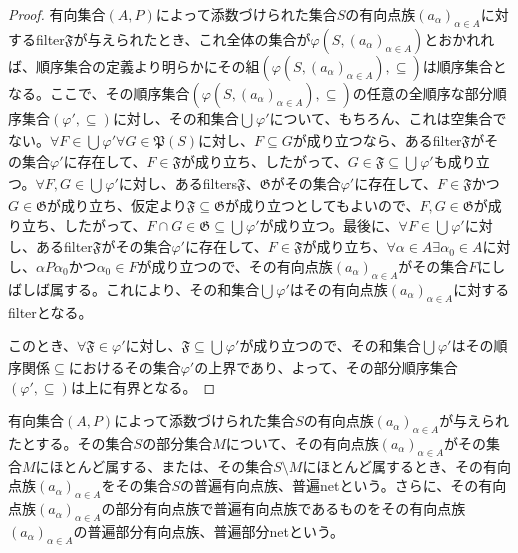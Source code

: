 \documentclass[dvipdfmx]{jsarticle}
\begin{document}
\begin{proof}
有向集合$(A,P)$によって添数づけられた集合$S$の有向点族$\left( a_{\alpha} \right)_{\alpha \in A}$に対するfilter$\mathfrak{F}$が与えられたとき、これ全体の集合が$\varphi\left( S,\left( a_{\alpha} \right)_{\alpha \in A} \right)$とおかれれば、順序集合の定義より明らかにその組$\left( \varphi\left( S,\left( a_{\alpha} \right)_{\alpha \in A} \right), \subseteq \right)$は順序集合となる。ここで、その順序集合$\left( \varphi\left( S,\left( a_{\alpha} \right)_{\alpha \in A} \right), \subseteq \right)$の任意の全順序な部分順序集合$\left( \varphi', \subseteq \right)$に対し、その和集合$\bigcup_{} \varphi'$について、もちろん、これは空集合でない。$\forall F \in \bigcup_{} \varphi'\forall G \in \mathfrak{P}(S)$に対し、$F \subseteq G$が成り立つなら、あるfilter$\mathfrak{F}$がその集合$\varphi'$に存在して、$F\in \mathfrak{F}$が成り立ち、したがって、$G \in \mathfrak{F \subseteq}\bigcup_{} \varphi'$も成り立つ。$\forall F,G \in \bigcup_{} \varphi'$に対し、あるfilters$\mathfrak{F}$、$\mathfrak{G}$がその集合$\varphi'$に存在して、$F\in \mathfrak{F}$かつ$G \in \mathfrak{G}$が成り立ち、仮定より$\mathfrak{F \subseteq G}$が成り立つとしてもよいので、$F,G \in \mathfrak{G}$が成り立ち、したがって、$F \cap G \in \mathfrak{G \subseteq}\bigcup_{} \varphi'$が成り立つ。最後に、$\forall F \in \bigcup_{} \varphi'$に対し、あるfilter$\mathfrak{F}$がその集合$\varphi'$に存在して、$F \in \mathfrak{F}$が成り立ち、$\forall\alpha \in A\exists\alpha_{0} \in A$に対し、$\alpha P\alpha_{0}$かつ$\alpha_{0} \in F$が成り立つので、その有向点族$\left( a_{\alpha} \right)_{\alpha \in A}$がその集合$F$にしばしば属する。これにより、その和集合$\bigcup_{} \varphi'$はその有向点族$\left( a_{\alpha} \right)_{\alpha \in A}$に対するfilterとなる。\par
このとき、$\mathfrak{\forall F \in}\varphi'$に対し、$\mathfrak{F \subseteq}\bigcup_{} \varphi'$が成り立つので、その和集合$\bigcup_{} \varphi'$はその順序関係$\subseteq$におけるその集合$\varphi'$の上界であり、よって、その部分順序集合$\left( \varphi', \subseteq \right)$は上に有界となる。
\end{proof}
\begin{dfn}
有向集合$(A,P)$によって添数づけられた集合$S$の有向点族$\left( a_{\alpha} \right)_{\alpha \in A}$が与えられたとする。その集合$S$の部分集合$M$について、その有向点族$\left( a_{\alpha} \right)_{\alpha \in A}$がその集合$M$にほとんど属する、または、その集合$S \setminus M$にほとんど属するとき、その有向点族$\left( a_{\alpha} \right)_{\alpha \in A}$をその集合$S$の普遍有向点族、普遍netという。さらに、その有向点族$\left( a_{\alpha} \right)_{\alpha \in A}$の部分有向点族で普遍有向点族であるものをその有向点族$\left( a_{\alpha} \right)_{\alpha \in A}$の普遍部分有向点族、普遍部分netという。
\end{dfn}
\end{document}
